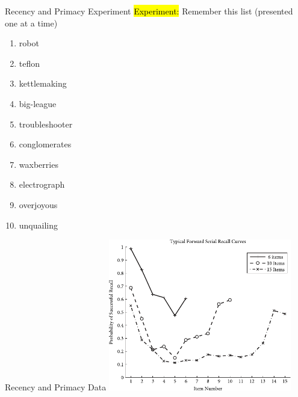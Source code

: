 \documentclass[handout,aspectratio=169]{beamer}
\begin{document}

  \begin{frame}{Recency and Primacy Experiment}
		\centering
		\Large
		\hl{Experiment:} Remember this list (presented one at a time)
		\begin{multicols}{2}
		\begin{enumerate}
			\centering
			\setlength{\itemsep}{0.25cm}
			\item robot
			\item teflon
			\item kettlemaking
			\item big-league
			\item troubleshooter
			\item conglomerates
			\item waxberries
			\item electrograph
			\item overjoyous
			\item unquailing
		\end{enumerate}
		\end{multicols}
	\end{frame}

	\begin{frame}{Recency and Primacy Data}
		\centering
		\includegraphics[width=0.6\textwidth]{media/htbab_recall_accuracy_jahnke.pdf}
	\end{frame}
\end{document}
